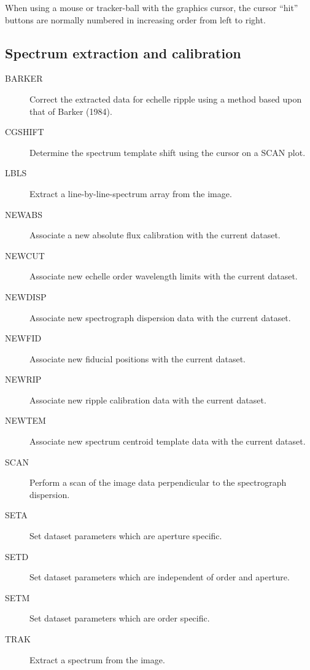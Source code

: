 When using a mouse or tracker-ball with the graphics cursor, the
cursor ``hit'' buttons are normally numbered in increasing order from
left to right. 

\subsection {Spectrum extraction and calibration}

\begin {description}

\item [BARKER] Correct the extracted data for echelle ripple using a 
method based upon that of Barker (1984).

\item [CGSHIFT] Determine the spectrum template shift using the cursor
on  a SCAN plot.

\item [LBLS] Extract a line-by-line-spectrum array from the image.

\item [NEWABS] Associate a new absolute flux calibration with the
current  dataset.

\item [NEWCUT] Associate new echelle order wavelength limits with the
current  dataset.

\item [NEWDISP] Associate new spectrograph dispersion data with the
current  dataset.

\item [NEWFID] Associate new fiducial positions with the current
dataset.

\item [NEWRIP] Associate new ripple calibration data with the current 
dataset.

\item [NEWTEM] Associate new spectrum centroid template data with the 
current dataset.

\item [SCAN] Perform a scan of the image data perpendicular to the 
spectrograph dispersion.

\item [SETA] Set dataset parameters which are aperture specific.

\item [SETD] Set dataset parameters which are independent of order and 
aperture.

\item [SETM] Set dataset parameters which are order specific.

\item [TRAK] Extract a spectrum from the image.

\end {description}

